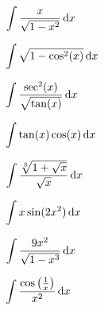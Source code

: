 \documentclass[10pt]{amsart}
\begin{document}
\vspace{2in}

\begin{multicols}{2}
  \begin{thm}
    \(\displaystyle{\int \frac{x}{\sqrt{1 - x^2}} \dif x}\)
  \end{thm}

  \begin{thm}
    \(\displaystyle{\int\sqrt{1 - \cos^2(x)} \dif x}\)
  \end{thm}
\end{multicols}

\newpage

\begin{multicols}{2}
  \begin{thm}
    \(\displaystyle{\int \frac{\sec^2(x)}{\sqrt{\tan(x)}} \dif x}\)
  \end{thm}

  \begin{thm}
    \(\displaystyle{\int \tan(x)\cos(x)\dif x}\)
  \end{thm}
\end{multicols}

\vspace{2in}

\begin{multicols}{2}
  \begin{thm}
    \(\displaystyle{\int \frac{\sqrt[3]{1 + \sqrt{x}}}{\sqrt{x}} \dif x}\)
  \end{thm}

  \begin{thm}
    \(\displaystyle{\int x\sin(2x^2) \dif x}\)
  \end{thm}
\end{multicols}

\vspace{2in}

\begin{multicols}{2}
  \begin{thm}
    \(\displaystyle{\int\frac{9x^2}{\sqrt{1 - x^3}}\dif x}\)
  \end{thm}

  \begin{thm}
    \(\displaystyle{\int\frac{\cos\left(\frac{1}{x}\right)}{x^2} \dif x}\)
  \end{thm}
\end{multicols}
\end{document}
